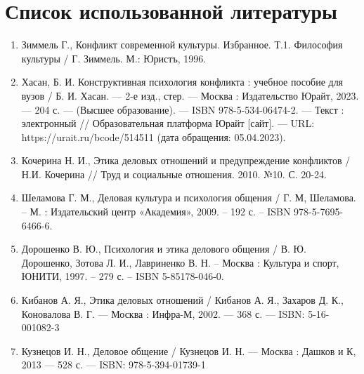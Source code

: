 \documentclass[a4paper,14pt]{extarticle}
\begin{document}
\pagebreak
\section{Список использованной литературы}

\begin{enumerate}
    \item Зиммель Г., Конфликт современной культуры. Избранное. Т.1. Философия культуры / Г. Зиммель. М.: Юристъ, 1996.
    \item  Хасан, Б. И.  Конструктивная психология конфликта : учебное пособие для вузов / Б. И. Хасан. — 2-е изд., стер. — Москва : Издательство Юрайт, 2023. — 204 с. — (Высшее образование). — ISBN 978-5-534-06474-2. — Текст : электронный // Образовательная платформа Юрайт [сайт]. — URL: https://urait.ru/bcode/514511 (дата обращения: 05.04.2023).
    \item Кочерина Н. И., Этика деловых отношений и предупреждение конфликтов / Н.И. Кочерина // Труд и социальные отношения. 2010. №10. С. 20-24.
    \item Шеламова Г. М., Деловая культура и психология общения / Г. М, Шеламова. – М. : Издательский центр «Академия», 2009. – 192 с. – ISBN 978-5-7695-6466-6.
    \item  Дорошенко В. Ю., Психология и этика делового общения / В. Ю. Дорошенко, Зотова Л. И., Лавриненко В. Н. – Москва : Культура и спорт, ЮНИТИ, 1997. – 279 с. – ISBN 5-85178-046-0.
    \item Кибанов А. Я., Этика деловых отношений / Кибанов А. Я., Захаров Д. К., Коновалова В. Г. — Москва : Инфра-М, 2002. — 368 с. — ISBN: 5-16-001082-3
    \item Кузнецов И. Н., Деловое общение / Кузнецов И. Н. — Москва : Дашков и К, 2013 — 528 с. — ISBN: 978-5-394-01739-1
\end{enumerate}
\end{document}
